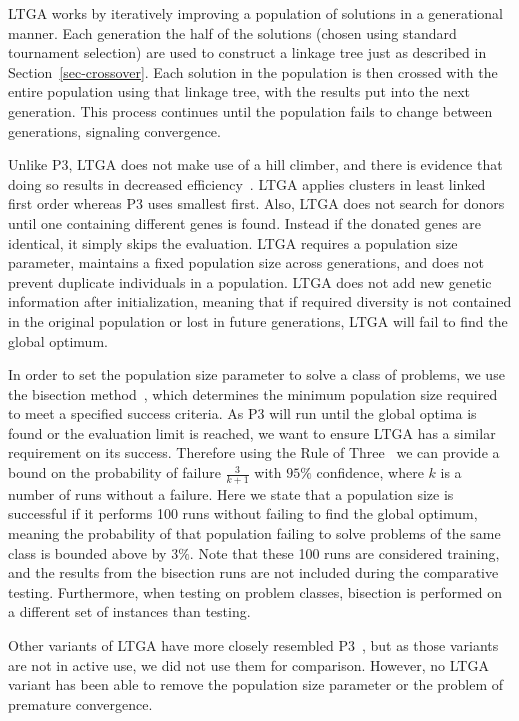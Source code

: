 \documentclass{sig-alternate}
\begin{document}
LTGA works by iteratively improving a population of solutions in a generational manner.
Each generation the half of the solutions (chosen using standard tournament selection)
are used to construct a linkage tree just as described in Section~\ref{sec-crossover}.
Each solution in the population is then crossed with the entire population using that
linkage tree, with the results put into the next generation.  This process continues
until the population fails to change between generations, signaling convergence.

Unlike P3, LTGA does not make use of a hill climber, and there is evidence that
doing so results in decreased efficiency~\cite{bosman:2011:lsbbo}.  LTGA applies
clusters in least linked first order whereas P3 uses smallest first.  Also, LTGA
does not search for donors until one containing different genes is found.  Instead
if the donated genes are identical, it simply skips the evaluation.  LTGA
requires a population size parameter, maintains a fixed population size across
generations, and does not prevent duplicate individuals in a population.  LTGA
does not add new genetic information after initialization, meaning that if
required diversity is not contained in the original population or lost in future
generations, LTGA will fail to find the global optimum.

In order to set the population size parameter to solve a class of problems, we use
the bisection method~\cite{goldman:2012:ltga}, which determines the minimum population
size required to meet a specified success criteria.  As P3 will run until the global optima
is found or the evaluation limit is reached, we want to ensure LTGA has a similar requirement
on its success.  Therefore using the Rule of Three~\cite{jovanovic:1997:ruleofthree} we
can provide a bound on the probability of failure $\frac{3}{k+1}$ with $95\%$ confidence,
where $k$ is a number of runs without a failure.  Here we state that a population size
is successful if it performs 100 runs without failing to find the global optimum, meaning
the probability of that population failing to solve problems of the same class is bounded above by
$3\%$.  Note that these 100 runs are considered training, and the results from the bisection
runs are not included during the comparative testing.  Furthermore, when testing on problem
classes, bisection is performed on a different set of instances than testing.

Other variants of LTGA have more closely resembled P3~\cite{goldman:2012:ltga},
but as those variants are not in active use, we did not use them for comparison.
However, no LTGA variant has been able to remove the population size parameter
or the problem of premature convergence.
\end{document}
